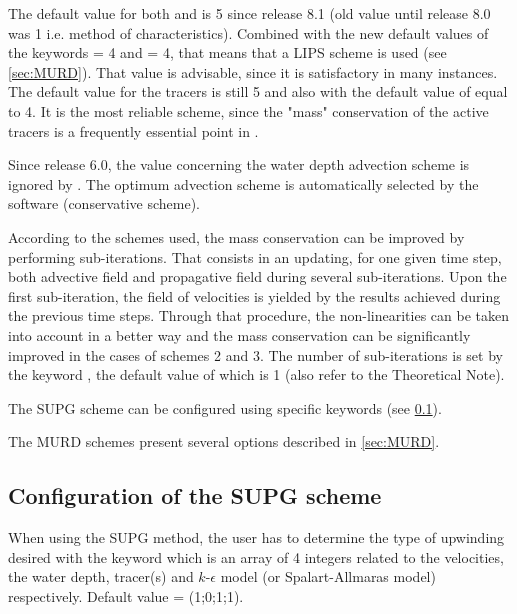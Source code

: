 The default value for both
 and
is 5 since release 8.1
(old value until release 8.0 was 1 i.e. method of characteristics). 
Combined with the new default values of the keywords
 = 4
and  = 4,
that means that a LIPS scheme is used (see \ref{sec:MURD}).
That value is advisable, since it is satisfactory in many instances.
The default value for the tracers is still 5 and also with the default value of
 equal to 4. It is the
most reliable scheme, since the "mass" conservation of the active tracers is a
frequently essential point in .

Since release 6.0, the value concerning the water depth advection scheme is
ignored by . The optimum advection scheme is automatically selected
by the software (conservative scheme).

According to the schemes used, the mass conservation can be improved by
performing sub-iterations. That consists in an updating, for one given time
step, both advective field and propagative field during several sub-iterations.
Upon the first sub-iteration, the field of velocities is yielded by the results
achieved during the previous time steps. Through that procedure, the
non-linearities can be taken into account in a better way and the mass
conservation can be significantly improved in the cases of schemes 2 and 3. The
number of sub-iterations is set by the keyword , the default value of which is 1 (also refer to the
Theoretical Note).

The SUPG scheme can be configured using specific keywords (see \ref{sec:supg}).

The MURD schemes present several options described in \ref{sec:MURD}.

\subsection{Configuration of the SUPG scheme}
\label{sec:supg}
When using the SUPG method, the user has to determine the type of upwinding
desired with the keyword  which is an array of 4 integers
related to the velocities, the water depth, tracer(s) and $k$-$\epsilon $ model
(or Spalart-Allmaras model) respectively.
Default value = (1;0;1;1).

